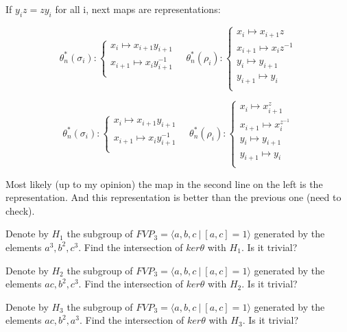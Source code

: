 \documentclass{article}
\begin{document}
If $y_i z = z y_i$ for all i, next maps are representations:

\begin{equation}\label{defGV}
\theta_n^*(\sigma_i):
\begin{cases}
x_i \mapsto x_{i+1}y_{i+1}\\
x_{i+1} \mapsto x_iy_{i+1}^{-1}\\
\end{cases}\quad
\theta_n^*(\rho_i):
\begin{cases}
x_i \mapsto x_{i+1}z\\
x_{i+1} \mapsto x_iz^{-1}\\
y_i \mapsto y_{i+1}\\
y_{i+1} \mapsto y_i\\
\end{cases}
\end{equation}

\begin{equation}\label{defGV}
\theta_n^*(\sigma_i):
\begin{cases}
x_i \mapsto x_{i+1}y_{i+1}\\
x_{i+1} \mapsto x_iy_{i+1}^{-1}\\
\end{cases}\quad
\theta_n^*(\rho_i):
\begin{cases}
x_i \mapsto x_{i+1}^z\\
x_{i+1} \mapsto x_i^{z^{-1}}\\
y_i \mapsto y_{i+1}\\
y_{i+1} \mapsto y_i\\
\end{cases}
\end{equation}

Most likely (up to my opinion) the map in the second line on the left is the representation. And this representation is better than the previous one (need to check).

Denote by $H_1$ the subgroup of $FVP_3=\langle a,b,c~|~[a,c]=1\rangle$ generated by the elements $a^3,b^2,c^3$. Find the intersection of $ker{\theta}$ with $H_1$. Is it trivial?

Denote by $H_2$ the subgroup of $FVP_3=\langle a,b,c~|~[a,c]=1\rangle$ generated by the elements $ac,b^2,c^3$. Find the intersection of $ker{\theta}$ with $H_2$. Is it trivial?

Denote by $H_3$ the subgroup of $FVP_3=\langle a,b,c~|~[a,c]=1\rangle$ generated by the elements $ac,b^2,a^3$. Find the intersection of $ker{\theta}$ with $H_3$. Is it trivial?
\end{document}
